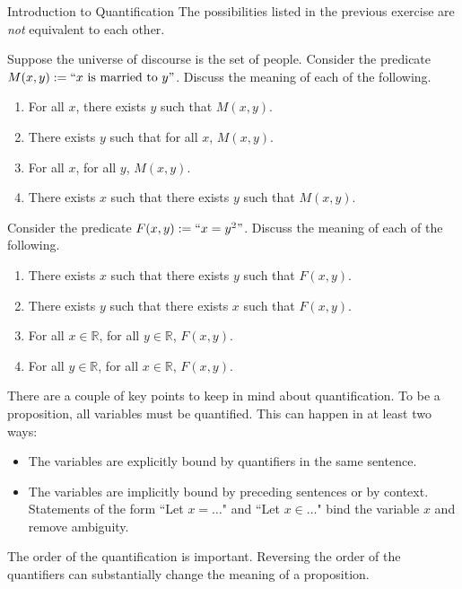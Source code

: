 \begin{section}{Introduction to Quantification}
The possibilities listed in the previous exercise are \emph{not} equivalent to each other.

\begin{exercise}
Suppose the universe of discourse is the set of people.  Consider the predicate $M(x,y):=``x\mbox{ is married to }y"$.  Discuss the meaning of each of the following.
\begin{enumerate}[label=\textrm{(\alph*)}]
\item For all $x$, there exists $y$ such that $M(x,y)$.
\item There exists $y$ such that for all $x$, $M(x,y)$.
\item For all $x$, for all $y$, $M(x,y)$.
\item There exists $x$ such that there exists $y$ such that $M(x,y)$.
\end{enumerate}
\end{exercise}

\begin{exercise}
Consider the predicate $F(x,y):=``x=y^2"$.  Discuss the meaning of each of the following.
\begin{enumerate}[label=\textrm{(\alph*)}]
\item There exists $x$ such that there exists $y$ such that $F(x,y)$.
\item There exists $y$ such that there exists $x$ such that $F(x,y)$.
\item For all $x\in \mathbb{R}$, for all $y\in\mathbb{R}$, $F(x,y)$.
\item For all $y\in \mathbb{R}$, for all $x\in\mathbb{R}$, $F(x,y)$.
\end{enumerate}
\end{exercise}


There are a couple of key points to keep in mind about quantification. To be a proposition, all variables must be quantified.  This can happen in at least two ways:
\begin{itemize}
\item The variables are explicitly bound by quantifiers in the same sentence.
\item The variables are implicitly bound by preceding sentences or by context. Statements of the form ``Let $x=\ldots$" and ``Let $x\in\ldots$" bind the variable $x$ and remove ambiguity.
\end{itemize}
The order of the quantification is important.  Reversing the order of the quantifiers can substantially change the meaning of a proposition.


\end{section}
